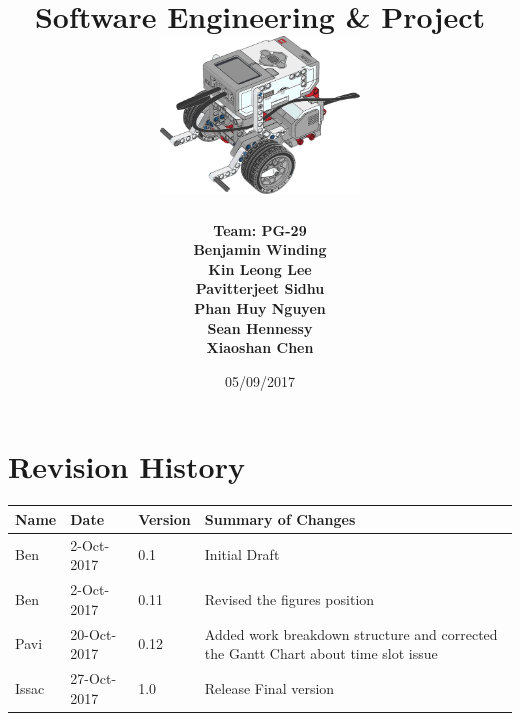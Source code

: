 \documentclass[10pt,a4paper,titlepage]{article}
\begin{document}
	
	\begin{titlepage}
		
		\title{
			\fontsize{50}{12}\\
			\vspace{20pt}
			\fontsize{20}{12}\\
			\vspace{10pt}
			\large{Software Engineering \& Project} \\
			\vspace{20pt}
			\includegraphics[width=200px]{title-page-ev3.png}					
		}
		\date{05/09/2017}
		\author{
			\bf{Team: PG-29} \\
			Benjamin Winding \\
			Kin Leong Lee \\
			Pavitterjeet Sidhu \\
			Phan Huy Nguyen \\
			Sean Hennessy \\
			Xiaoshan Chen \\
		}
		\maketitle
		
	\end{titlepage}
		 
	\tableofcontents	
	\listoffigures
	\listoftables
	
	
	\section*{Revision History}	
	\label{revtable}	
	\begin{tabular}{|p{2.1cm}|p{2.5cm}|p{2cm}|p{4.1cm}|}		
		\hline 
		\textbf {Name} & \textbf{Date} & \textbf {Version} &\textbf {Summary of Changes} \\ \hline
		Ben & 2-Oct-2017 & 0.1 & Initial Draft\\ 
		Ben & 2-Oct-2017 & 0.11 & Revised the figures position\\ \hline
		Pavi & 20-Oct-2017 & 0.12 & Added work breakdown structure and corrected the Gantt Chart about time slot issue \\ \hline
		Issac & 27-Oct-2017 & 1.0 & Release Final version \\ \hline
		
	\end{tabular}
\end{document}

